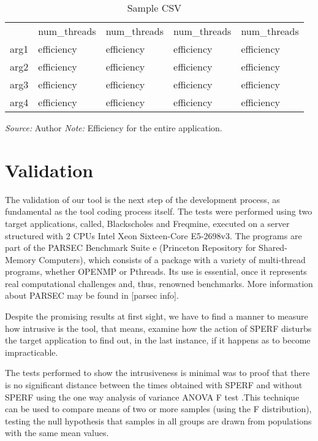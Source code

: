 \documentclass[sigconf]{acmart}
\begin{document}
\begin{table}[H]%
\caption{Sample CSV}
\label{tab:sampleCSV}
\begin{minipage}{\columnwidth}
\begin{center}
\begin{tabular}{lllll}
     & num\_threads & num\_threads & num\_threads & num\_threads \\
arg1 & efficiency & efficiency & efficiency & efficiency \\
arg2 & efficiency & efficiency & efficiency & efficiency \\
arg3 & efficiency & efficiency & efficiency & efficiency \\
arg4 & efficiency & efficiency & efficiency & efficiency \\
\end{tabular}
\end{center}
\bigskip\centering
\footnotesize\emph{Source:} Author
\emph{Note:} Efficiency for the entire application.
\end{minipage}
\end{table}%

\section{Validation}
\label{sec:validation}

The validation of our tool is the next step of the development process, as fundamental as the tool coding process itself. The tests were performed using two target applications, called, Blackscholes and Freqmine, executed on a server structured with 2 CPUs Intel Xeon Sixteen-Core E5-2698v3. The programs are part of the PARSEC Benchmark Suite \cite{Southern2016} e \cite{Bienia2010} (Princeton Repository for Shared- Memory Computers), which consists of a package with a variety of multi-thread programs, whether OPENMP or Pthreads. Its use is essential, once it represents real computational challenges and, thus, renowned benchmarks. More information about PARSEC may be found in [parsec info].

Despite the promising results at first sight, we have to find a manner to measure how intrusive is the tool, that means, examine how the action of SPERF disturbs the target application to find out, in the last instance, if it happens as to become impracticable.

The tests performed to show the intrusiveness is minimal was to proof that there is no significant distance between the times obtained with SPERF and without SPERF using the one way analysis of variance ANOVA F test \cite{Tiku1971}.This technique can be used to compare means of two or more samples (using the F distribution), testing the null hypothesis that samples in all groups are drawn from populations with the same mean values.
\end{document}
